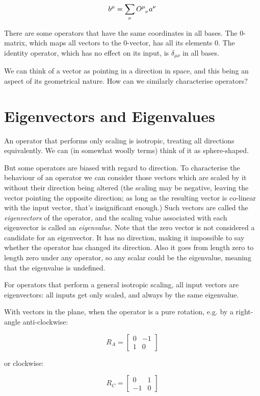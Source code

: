 $$
b^\mu = \sum_{\nu} O\indices{^\mu_\nu} a^\nu
$$

There are some operators that have the same coordinates in all bases. The $0$-matrix, which maps all vectors to the $0$-vector, has all its elements $0$. The identity operator, which has no effect on its input, is $\delta_{\mu\nu}$ in all bases.

We can think of a vector as pointing in a direction in space, and this being an aspect of its geometrical nature. How can we similarly characterise operators?

\section{Eigenvectors and Eigenvalues}\label{sec:vectors-eigen}

An operator that performs only scaling is isotropic, treating all directions equivalently. We can (in somewhat woolly terms) think of it as sphere-shaped.

But some operators are biased with regard to direction. To characterise the behaviour of an operator we can consider those vectors which are scaled by it without their direction being altered (the scaling may be negative, leaving the vector pointing the opposite direction; as long as the resulting vector is co-linear with the input vector, that's insignificant enough.) Such vectors are called the \textit{eigenvectors} of the operator, and the scaling value associated with each eigenvector is called an \textit{eigenvalue}. Note that the zero vector is not considered a candidate for an eigenvector. It has no direction, making it impossible to say whether the operator has changed its direction. Also it goes from length zero to length zero under any operator, so any scalar could be the eigenvalue, meaning that the eigenvalue is undefined.

For operators that perform a general isotropic scaling, all input vectors are eigenvectors: all inputs get only scaled, and always by the same eigenvalue.

With vectors in the plane, when the operator is a pure rotation, e.g. by a right-angle anti-clockwise:

$$R_A = \begin{bmatrix}0 & -1 \\ 1 & 0\end{bmatrix}$$

or clockwise:

$$R_C = \begin{bmatrix}0 & 1 \\ -1 & 0\end{bmatrix}$$

